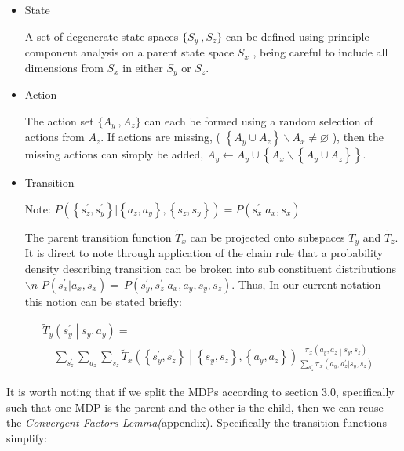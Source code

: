\documentclass[compsoc,journal,letterpaper,10pt,draftcls,twocolumn]{IEEEtran}
\begin{document}
\begin{itemize}
\item
  State

  A set of degenerate state spaces \(\{ S_{y}\ ,S_{z}\}\) can be defined
  using principle component analysis on a parent state space \(S_{x}\) ,
  being careful to include all dimensions from \(S_{x}\) in either
  \(S_{y}\) or \(S_{z}\).
\item
  Action

  The action set \(\{ A_{y}\ ,A_{z}\}\) can each be formed using a
  random selection of actions from \(A_{z}\). If actions are missing, (
  \(\left\{ A_{y} \cup A_{z} \right\}\backslash A_{x} \neq \varnothing \)
  ), then the missing actions can simply be added,
  \(A_{y} \leftarrow A_{y} \cup \left\{ A_{x}\backslash\left\{ A_{y} \cup A_{z} \right\} \right\}\).
\item
  Transition

  Note:
  \(P\left( \left\{ s_{z}^{'},s_{y}^{'} \right\}|\left\{ a_{z},a_{y} \right\},\left\{ s_{z},s_{y} \right\} \right) = P\left( s_{x}^{'}|a_{x},s_{x} \right)\)

  The parent transition function \({\tilde{T}}_{x}\) can be projected
  onto subspaces \({\tilde{T}}_{y}\) and \({\tilde{T}}_{z}\). It is
  direct to note through application of the chain rule that a
  probability density describing transition can be broken into sub
  constituent distributions\(\backslash n\)
  \(P\left( s_{x}^{'}|a_{x},s_{x} \right) = \ P\left( s_{y}^{'},s_{z}^{'}|a_{x},a_{y},s_{y},s_{z} \right)\).
  Thus, In our current notation this notion can be stated briefly:
\end{itemize}

 
\begin{align}
& {\tilde{T}}_{y}\left( s_{y}^{\prime} \middle| s_{y}, a_{y} \right) = \nonumber \\
& \quad
\sum_{s_{z}^{\prime}}\sum_{a_{z}}\sum_{s_{z}}{\tilde{T}}_{x}\left( \left\{ s_{y}^{\prime},s_{z}^{\prime} \right\} \middle| \left\{ s_{y}^{\ },s_{z}^{\ } \right\},\left\{ a_{y},a_{z} \right\} \right) \frac{\pi_{x}\left( a_{y}, a_{z} \middle| s_{y} ,s_{z} \right)}{\displaystyle\sum_{a_{z}^{\prime}}\pi_{x}\left( a_{y},a_{z}^{\prime}|s_{y},s_{z} \right)}
\end{align}
 

It is worth noting that if we split the MDPs according to section 3.0,
specifically such that one MDP is the parent and the other is the child,
then we can reuse the \emph{Convergent Factors Lemma(}appendix).
Specifically the transition functions simplify:
\end{document}
